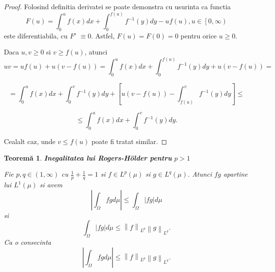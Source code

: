 \documentclass[a4paper,12pt,oneside]{report}
\newtheorem{theorem}{Teorem\u a}
\begin{document}
\begin{proof}
Folosind definitia derivatei se poate demonstra cu usurinta ca functia
\begin{displaymath}
  F\left ( u \right )= \int_{0}^{u}f\left ( x \right )dx + \int_{0}^{f\left ( u \right )}f^{-1}\left ( y \right )dy -uf\left ( u \right ), u \in \left [ 0,\infty  \right )
\end{displaymath}
este diferentiabila, cu \({F}'\) $\equiv 0.$ Astfel, \(F\left ( u \right )= F\left ( 0 \right )= 0\) pentru orice \(u\geq 0\).
	
Daca \(u, v \geq 0\)  si \(v\geq f\left ( u \right )\), atunci
\begin{displaymath}
  uv = uf\left ( u \right )+ u\left ( v- f\left ( u \right ) \right )=  \int_{0}^{u}f\left ( x \right )dx + \int_{0}^{f\left ( u \right )}f^{-1}\left ( y \right )dy + u\left ( v - f\left ( u \right ) \right ) =
\end{displaymath}

\begin{displaymath}
  = \int_{0}^{u}f\left ( x \right )dx + \int_{0}^{v}f^{-1}\left ( y \right )dy + \left [ u\left ( v-f\left ( u \right )  \right ) - \int_{f\left ( u \right )}^{v}f^{-1}\left ( y \right )dy\right ]\leq
\end{displaymath}

\begin{displaymath}
  \leq \int_{0}^{u}f\left ( x \right )dx + \int_{0}^{v}f^{-1}\left ( y \right )dy.
\end{displaymath}



	Cealalt caz, unde \(v\leq f\left ( u \right )\) poate fi tratat similar.
\end{proof}

\begin{theorem}

\textbf{Inegalitatea lui Rogers-Hölder pentru} \(p > 1\)

Fie \(p,q \in \left ( 1, \infty  \right )\) cu \(\frac{1}{p} + \frac{1}{q} = 1\) si  \(f\in L^{p}\left ( \mu  \right )\) si \(g\in L^{q}\left ( \mu  \right )\). Atunci \(fg\) apartine lui \(L^{1}\left ( \mu  \right )\) si avem
\begin{displaymath}
  \left | \int_{\Omega}^{} fg  d\mu \right |\leq \int_{\Omega}^{}\left | fg \right |d\mu \label{eq:1.6} \tag{1.6}
\end{displaymath}
si
\begin{displaymath}
  \int_{\Omega}^{}\left | fg \right |d\mu \leq \left \| f \right \|_{L^{p}}\left \| g \right \|_{{L}^{q}}. \label{eq:1.7} \tag{1.7}
\end{displaymath}
Ca o consecinta
\begin{displaymath}
  \left | \int_{\Omega}^{} fg  d\mu \right |\leq \left \| f \right \|_{L^{p}}\left \| g \right \|_{{L}^{q}}. \label{eq:1.8} \tag{1.8}
\end{displaymath}
\end{theorem}
\end{document}
